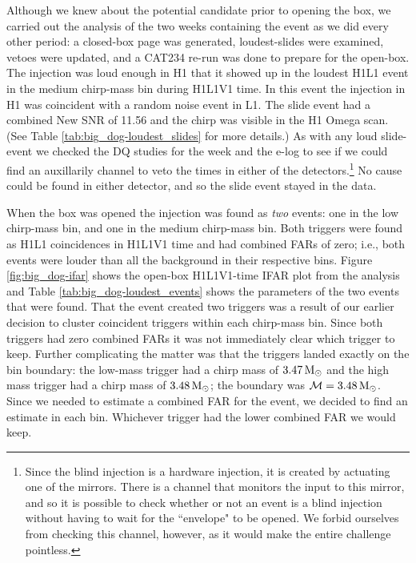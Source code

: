 Although we knew about the potential candidate prior to opening the box, we carried out the analysis of the two weeks containing the event as we did every other period: a closed-box page was generated, loudest-slides were examined, vetoes were updated, and a CAT234 re-run was done to prepare for the open-box. The injection was loud enough in H1 that it showed up in the loudest H1L1 event in the medium chirp-mass bin during H1L1V1 time. In this event the injection in H1 was coincident with a random noise event in L1. The slide event had a combined New \ac{SNR} of 11.56 and the chirp was visible in the H1 Omega scan. (See Table \ref{tab:big_dog-loudest_slides} for more details.) As with any loud slide-event we checked the \ac{DQ} studies for the week and the e-log to see if we could find an auxillarily channel to veto the times in either of the detectors.\footnote{Since the blind injection is a hardware injection, it is created by actuating one of the mirrors. There is a channel that monitors the input to this mirror, and so it is possible to check whether or not an event is a blind injection without having to wait for the ``envelope" to be opened. We forbid ourselves from checking this channel, however, as it would make the entire challenge pointless.} No cause could be found in either detector, and so the slide event stayed in the data.

When the box was opened the injection was found as \emph{two} events: one in the low chirp-mass bin, and one in the medium chirp-mass bin. Both triggers were found as H1L1 coincidences in H1L1V1 time and had combined \acp{FAR} of zero; i.e., both events were louder than all the background in their respective bins. Figure \ref{fig:big_dog-ifar} shows the open-box H1L1V1-time IFAR plot from the analysis and Table \ref{tab:big_dog-loudest_events} shows the parameters of the two events that were found. That the event created two triggers was a result of our earlier decision to cluster coincident triggers within each chirp-mass bin. Since both triggers had zero combined \acp{FAR} it was not immediately clear which trigger to keep. Further complicating the matter was that the triggers landed exactly on the bin boundary: the low-mass trigger had a chirp mass of $3.47\,\mathrm{M_\odot}$ and the high mass trigger had a chirp mass of $3.48\,\mathrm{M_\odot}$; the boundary was $\mathcal{M} = 3.48\,\mathrm{M_\odot}$. Since we needed to estimate a combined \ac{FAR} for the event, we decided to find an estimate in each bin. Whichever trigger had the lower combined \ac{FAR} we would keep.


